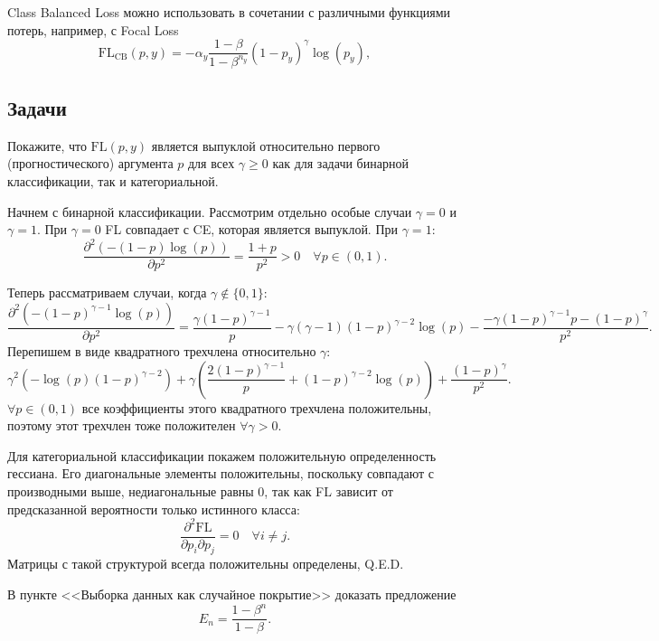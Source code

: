 \begin{remark}
    Class Balanced Loss можно использовать в сочетании с различными функциями потерь, например, с Focal Loss
    \[
        \text{FL}_\text{CB}(p,y)=-\alpha_y\dfrac{1-\beta}{1-\beta^{n_y}}(1-p_y)^\gamma\log(p_y),
    \]
\end{remark}

\subsection*{Задачи}

\begin{problem}
Покажите, что $\text{FL}(p,y)$ является выпуклой относительно первого (прогностического) аргумента $p$ для всех $\gamma \ge 0$ как для задачи бинарной классификации, так и категориальной.
\end{problem}

\begin{solution}
    Начнем с бинарной классификации. Рассмотрим отдельно особые случаи $\gamma=0$ и $\gamma=1$. При $\gamma=0$ FL совпадает с CE, которая является выпуклой. При $\gamma=1$:
    \[
        \dfrac{\partial^2\left(-(1-p)\log(p)\right)}{\partial p^2}=\dfrac{1+p}{p^2}>0 \quad \forall p \in (0,1).
    \]

    Теперь рассматриваем случаи, когда $\gamma\notin\{0,1\}$:
    \[
        \dfrac{\partial^2\left(-(1-p)^{\gamma-1}\log(p)\right)}{\partial p^2}=\dfrac{\gamma(1-p)^{\gamma-1}}{p}-\gamma(\gamma-1)(1-p)^{\gamma-2}\log(p)-\dfrac{-\gamma(1-p)^{\gamma-1}p-(1-p)^\gamma}{p^2}.
    \]
    Перепишем в виде квадратного трехчлена относительно $\gamma$:
    \[
        \gamma^2\left(-\log(p)(1-p)^{\gamma-2}\right)+\gamma\left(\dfrac{2(1-p)^{\gamma-1}}{p}+(1-p)^{\gamma-2}\log(p)\right)+\dfrac{(1-p)^\gamma}{p^2}.
    \]
    $\forall p \in (0,1)$ все коэффициенты этого квадратного трехчлена положительны, поэтому этот трехчлен тоже положителен $\forall \gamma>0$.

    Для категориальной классификации покажем положительную определенность гессиана. Его диагональные элементы положительны, поскольку совпадают с производными выше, недиагональные равны 0, так как FL зависит от предсказанной вероятности только истинного класса:
    \[
        \dfrac{\partial^2\text{FL}}{\partial p_i \partial p_j}=0 \quad \forall i \neq j.
    \]
    Матрицы с такой структурой всегда положительны определены, Q.E.D.
\end{solution}

\begin{problem}
В пункте <<Выборка данных как случайное покрытие>>  доказать предложение
\[
    E_n=\dfrac{1-\beta^n}{1-\beta}.
\]
\end{problem}

